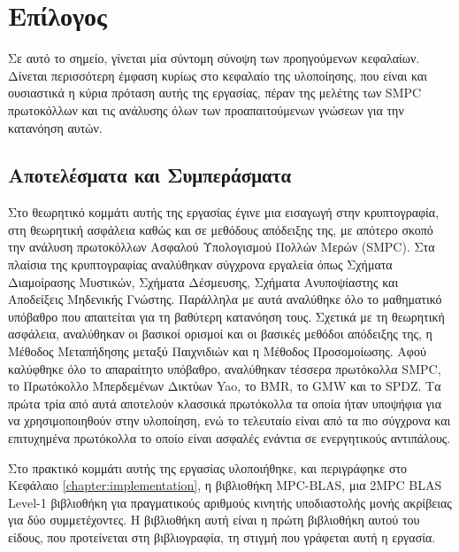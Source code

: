 \chapter{Επίλογος}
\label{chapter:postamble}

Σε αυτό το σημείο, γίνεται μία σύντομη σύνοψη των προηγούμενων κεφαλαίων. Δίνεται περισσότερη έμφαση κυρίως στο κεφαλαίο της υλοποίησης, που είναι και ουσιαστικά η κύρια πρόταση αυτής της εργασίας, πέραν της μελέτης των SMPC πρωτοκόλλων και τις ανάλυσης όλων των προαπαιτούμενων γνώσεων για την κατανόηση αυτών.

\section{Αποτελέσματα και Συμπεράσματα}

Στο θεωρητικό κομμάτι αυτής της εργασίας έγινε μια εισαγωγή στην κρυπτογραφία, στη θεωρητική ασφάλεια καθώς και σε μεθόδους απόδειξης της, με απότερο σκοπό την ανάλυση πρωτοκόλλων Ασφαλού Υπολογισμού Πολλών Μερών (SMPC). Στα πλαίσια της κρυπτογραφίας αναλύθηκαν σύγχρονα εργαλεία όπως Σχήματα Διαμοίρασης Μυστικών, Σχήματα Δέσμευσης, Σχήματα Ανυποψίαστης και Αποδείξεις Μηδενικής Γνώστης. Παράλληλα με αυτά αναλύθηκε όλο το μαθηματικό υπόβαθρο που απαιτείται για τη βαθύτερη κατανόηση τους. Σχετικά με τη θεωρητική ασφάλεια, αναλύθηκαν οι βασικοί ορισμοί και οι βασικές μεθόδοι απόδειξης της, η Μέθοδος Μεταπήδησης μεταξύ Παιχνιδιών και η Μέθοδος Προσομοίωσης. Αφού καλύφθηκε όλο το απαραίτητο υπόβαθρο, αναλύθηκαν τέσσερα πρωτόκολλα SMPC, το Πρωτόκολλο Μπερδεμένων Δικτύων Yao, το BMR, το GMW και το SPDZ. Τα πρώτα τρία από αυτά αποτελούν κλασσικά πρωτόκολλα τα οποία ήταν υποψήφια για να χρησιμοποιηθούν στην υλοποίηση, ενώ το τελευταίο είναι από τα πιο σύγχρονα και επιτυχημένα πρωτόκολλα το οποίο είναι ασφαλές ενάντια σε ενεργητικούς αντιπάλους.

Στο πρακτικό κομμάτι αυτής της εργασίας υλοποιήθηκε, και περιγράφηκε στο Κεφάλαιο \ref{chapter:implementation}, η βιβλιοθήκη MPC-BLAS, μια 2MPC BLAS Level-1 βιβλιοθήκη για πραγματικούς αριθμούς κινητής υποδιαστολής μονής ακρίβειας για δύο συμμετέχοντες. Η βιβλιοθήκη αυτή είναι η πρώτη βιβλιοθήκη αυτού του είδους, που προτείνεται στη βιβλιογραφία, τη στιγμή που γράφεται αυτή η εργασία.

